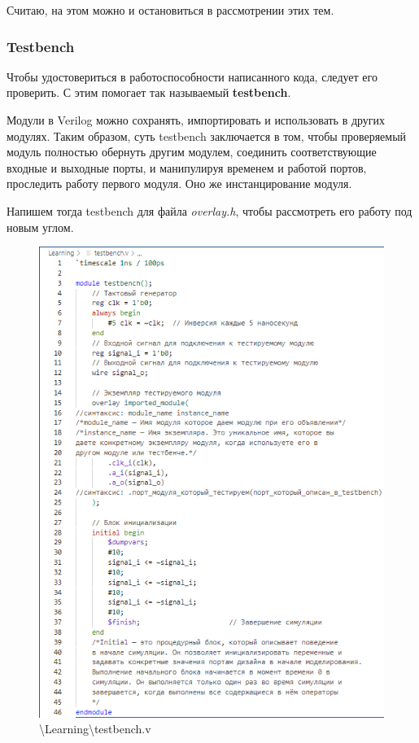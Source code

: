 \documentclass[a4paper,12pt]{article} %
\begin{document}
Считаю, на этом можно и остановиться в рассмотрении этих тем. 

\subsubsection{Testbench}

Чтобы удостовериться в работоспособности написанного кода, следует его проверить. С этим помогает так называемый \textbf{testbench}. 

Модули в Verilog можно сохранять, импортировать и использовать в других модулях. Таким образом, суть testbench заключается в том, чтобы проверяемый модуль полностью обернуть другим модулем, соединить соответствующие входные и выходные порты, и манипулируя временем и работой портов, проследить работу первого модуля. Оно же инстанцирование модуля.

Напишем тогда testbench для файла \textit{overlay.h}, чтобы рассмотреть его работу под новым углом.

\begin{figure}[H]
    \centering
    \includegraphics[width=1\linewidth]{Learning/TB_description.png}
    \caption{\textbackslash Learning\textbackslash testbench.v}
\end{figure}
\end{document}
